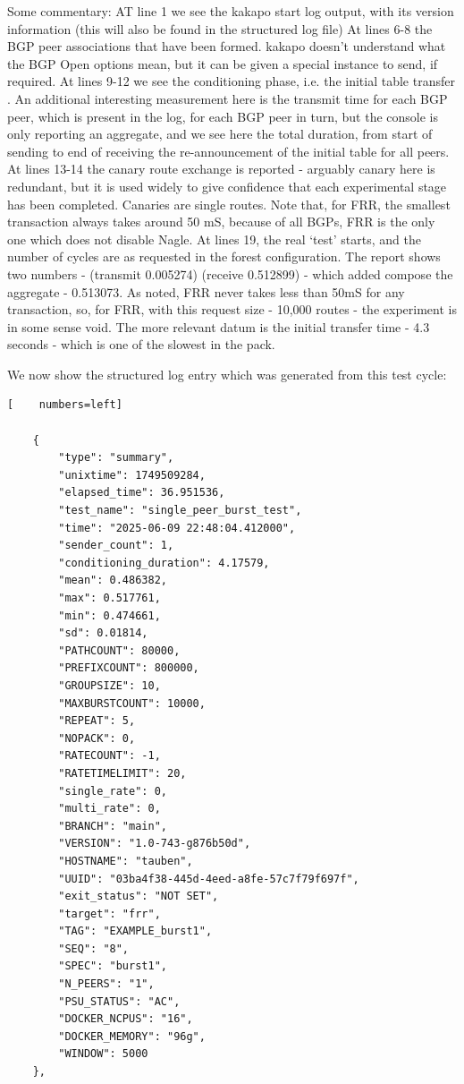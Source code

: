 Some commentary: 
AT line 1 we see the kakapo start log output, with its version information (this will also be found in the structured log file)
At lines 6-8 the BGP peer associations that have been formed.  kakapo doesn't understand what the BGP Open options mean, but it can be given a special instance to send, if required.
At lines 9-12 we see the conditioning phase, i.e. the initial table transfer .
An additional interesting measurement here is the transmit time for each BGP peer, which is present in the log, for each BGP peer in turn, but the console is only reporting an aggregate, and we see here the total duration, from start of sending to end of receiving the re-announcement of the initial table for all peers.
At lines 13-14 the canary route exchange is reported - arguably canary here is redundant, but it is used widely to give confidence that each experimental stage has been completed.  Canaries are single routes.  Note that, for FRR, the smallest transaction always takes around 50 mS, because of all BGPs, FRR is the only one which does not disable Nagle.
At lines 19, the real `test' starts, and the number of cycles are as requested in the forest configuration. 
The report shows two numbers - (transmit 0.005274) (receive 0.512899) -  which added compose the aggregate - 0.513073.  As noted, FRR never takes less than 50mS for any transaction, so, for FRR, with this request size - 10,000 routes - the experiment is in some sense void.
The more relevant datum is the initial transfer time - 4.3 seconds - which is one of the slowest in the pack.   

We now show the structured log entry which was generated from this test cycle:

\begin{lstlisting}[    numbers=left]

    {
        "type": "summary",
        "unixtime": 1749509284,
        "elapsed_time": 36.951536,
        "test_name": "single_peer_burst_test",
        "time": "2025-06-09 22:48:04.412000",
        "sender_count": 1,
        "conditioning_duration": 4.17579,
        "mean": 0.486382,
        "max": 0.517761,
        "min": 0.474661,
        "sd": 0.01814,
        "PATHCOUNT": 80000,
        "PREFIXCOUNT": 800000,
        "GROUPSIZE": 10,
        "MAXBURSTCOUNT": 10000,
        "REPEAT": 5,
        "NOPACK": 0,
        "RATECOUNT": -1,
        "RATETIMELIMIT": 20,
        "single_rate": 0,
        "multi_rate": 0,
        "BRANCH": "main",
        "VERSION": "1.0-743-g876b50d",
        "HOSTNAME": "tauben",
        "UUID": "03ba4f38-445d-4eed-a8fe-57c7f79f697f",
        "exit_status": "NOT SET",
        "target": "frr",
        "TAG": "EXAMPLE_burst1",
        "SEQ": "8",
        "SPEC": "burst1",
        "N_PEERS": "1",
        "PSU_STATUS": "AC",
        "DOCKER_NCPUS": "16",
        "DOCKER_MEMORY": "96g",
        "WINDOW": 5000
    },
\end{lstlisting}

